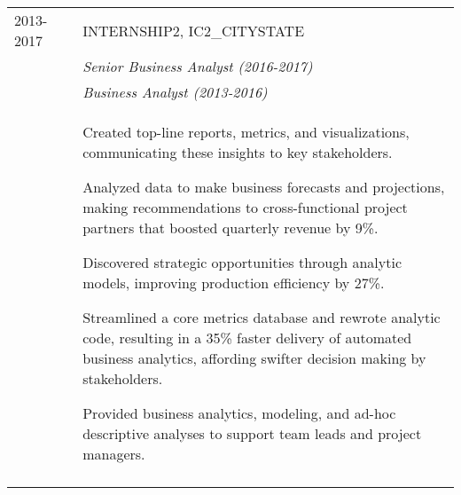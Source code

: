 \documentclass[a4paper,10pt]{article}
\begin{document}
\begin{supertabular}{l p{0.55cm} p{13.9cm}}
	\textsc{2013-2017}		&& \textsc{INTERNSHIP2}, IC2_CITYSTATE \\
												&& \small	\emph{Senior Business Analyst (2016-2017)} \\
												&& \small	\emph{Business Analyst (2013-2016)} \\
												&& \begin{enumerate*}[label =$\diamond$, itemjoin={\newline}]
														\item \footnotesize Created top-line reports, metrics, and visualizations, communicating these insights to key stakeholders.
														\item \footnotesize Analyzed data to make business forecasts and projections, making recommendations to cross-functional project partners that boosted quarterly revenue by 9\%.
														\item \footnotesize Discovered strategic opportunities through analytic models, improving production efficiency by 27\%.
									          \item \footnotesize Streamlined a core metrics database and rewrote analytic code, resulting in a 35\% faster delivery of automated business analytics, affording swifter decision making by stakeholders.
														\item \footnotesize Provided business analytics, modeling, and ad-hoc descriptive analyses to support team leads and project managers.
													\end{enumerate*} \\
	 \\



\end{supertabular}





\smallskip
\end{document}
